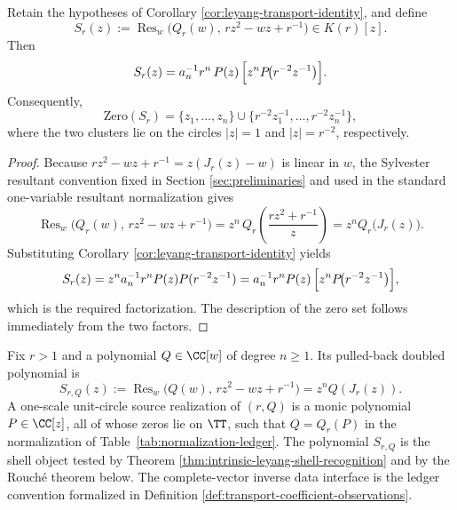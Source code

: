 \begin{corollary}\label{cor:leyang-double-resultant}
Retain the hypotheses of Corollary \ref{cor:leyang-transport-identity}, and define
\[
S_r(z):=\operatorname{Res}_w\!\bigl(Q_r(w),\,r z^2-w z+r^{-1}\bigr)\in K(r)[z].
\]
Then
\[
S_r(z)=a_n^{-1} r^{n}\,P(z)\,\Bigl[z^{n}P\!\bigl(r^{-2}z^{-1}\bigr)\Bigr].
\]
Consequently,
\[
\mathrm{Zero}(S_r)
=\{z_1,\dots,z_n\}\cup\{r^{-2}z_1^{-1},\dots,r^{-2}z_n^{-1}\},
\]
where the two clusters lie on the circles \(|z|=1\) and \(|z|=r^{-2}\), respectively.
\end{corollary}

\begin{proof}
Because \(r z^2-w z+r^{-1}=z(J_r(z)-w)\) is linear in \(w\), the Sylvester resultant convention fixed in Section \ref{sec:preliminaries} and used in the standard one-variable resultant normalization \citep[Chap.~12]{GKZ1994} gives
\[
\operatorname{Res}_w\!\bigl(Q_r(w),\,r z^2-w z+r^{-1}\bigr)
=z^n\,Q_r\!\left(\frac{r z^2+r^{-1}}{z}\right)
=z^n Q_r\!\bigl(J_r(z)\bigr).
\]
Substituting Corollary \ref{cor:leyang-transport-identity} yields
\[
S_r(z)=z^n a_n^{-1}r^n P(z)P(r^{-2}z^{-1})
=a_n^{-1}r^{n}P(z)\,\Bigl[z^{n}P\!\bigl(r^{-2}z^{-1}\bigr)\Bigr],
\]
which is the required factorization. The description of the zero set follows immediately from the two factors.
\end{proof}


\begin{definition}\label{def:noiseless-leyang-reconstruction-data}
Fix \(r>1\) and a polynomial \(Q\in\CC[w]\) of degree \(n\ge1\).  Its pulled-back doubled polynomial is
\[
S_{r,Q}(z):=\operatorname{Res}_w\!\bigl(Q(w),\,r z^2-w z+r^{-1}\bigr)=z^nQ(J_r(z)).
\]
A one-scale unit-circle source realization of \((r,Q)\) is a monic polynomial \(P\in\CC[z]\), all of whose zeros lie on \(\TT\), such that \(Q=Q_r(P)\) in the normalization of Table~\ref{tab:normalization-ledger}.  The polynomial \(S_{r,Q}\) is the shell object tested by Theorem \ref{thm:intrinsic-leyang-shell-recognition} and by the Rouch\'e theorem below.  The complete-vector inverse data interface is the ledger convention formalized in Definition \ref{def:transport-coefficient-observations}.
\end{definition}

